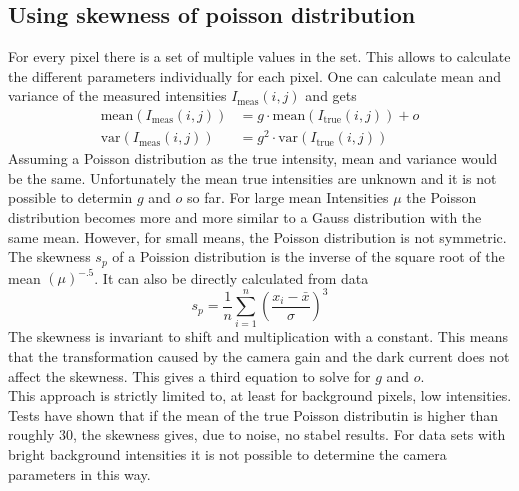 \subsection{Using skewness of poisson distribution}
For every pixel there is a set of multiple values in the set. This allows to
calculate the different parameters individually for each pixel. One can
calculate mean and variance of the measured intensities $I_\text{meas}(i,j)$ and
gets
\begin{align}
	\text{mean}(I_\text{meas}(i,j))& = g\cdot \text{mean}(I_\text{true}(i,j)) + o \label{meanvarPoiss1}\\
	\text{var}(I_\text{meas}(i,j))& = g^2\cdot\text{var}(I_\text{true}(i,j)) \label{meanvarPoiss2}
\end{align}
Assuming a Poisson distribution as the true intensity, mean and variance would
be the same. Unfortunately the mean true intensities are unknown and it is
not possible to determin $g$ and $o$ so far. For large mean Intensities $\mu$
the Poisson distribution becomes more and more similar to a Gauss distribution
with the same mean. However, for small means, the Poisson distribution is not
symmetric. The skewness $s_p$ of a Poission distribution is the inverse of the
square root of the mean $(\mu)^{-.5}$. It can also be directly
calculated from data
\begin{equation}
	s_p = \frac{1}{n}\sum_{i = 1}^n \left(\frac{x_i - \bar x}{\sigma}\right)^3
\end{equation}
The skewness is invariant to shift and multiplication with a constant. This
means that the transformation caused by the camera gain and the dark current
does not affect the skewness. This gives a third equation to solve for $g$ and
$o$.\\
This approach is strictly limited to, at least for background pixels, low intensities. Tests have shown that if the mean of the true Poisson distributin is higher than roughly 30, the skewness gives, due to noise, no stabel results. For data sets with bright background intensities it is not possible to determine the camera parameters in this way.